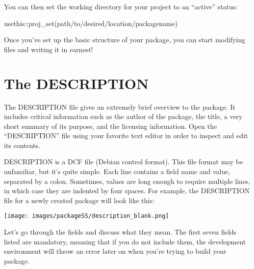\documentclass[
]{book}
\newenvironment{Shaded}{\begin{snugshade}}{\end{snugshade}}
\newcommand{\FunctionTok}[1]{\textcolor[rgb]{0.00,0.00,0.00}{#1}}
\newcommand{\NormalTok}[1]{#1}
\newcommand{\SpecialCharTok}[1]{\textcolor[rgb]{0.00,0.00,0.00}{#1}}
\newcommand{\StringTok}[1]{\textcolor[rgb]{0.31,0.60,0.02}{#1}}
\begin{document}
You can then set the working directory for your project to an ``active'' status:

\begin{Shaded}
\begin{Highlighting}[]
\NormalTok{usethis}\SpecialCharTok{::}\FunctionTok{proj\_set}\NormalTok{(}\StringTok{\textquotesingle{}path/to/desired/location/packagename\textquotesingle{}}\NormalTok{)}
\end{Highlighting}
\end{Shaded}

Once you've set up the basic structure of your package, you can start modifying files and writing it in earnest!

\hypertarget{the-description}{%
\section{The DESCRIPTION}\label{the-description}}

The DESCRIPTION file gives an extremely brief overview to the package. It includes critical information such as the author of the package, the title, a very short summary of its purpose, and the licensing information. Open the ``DESCRIPTION'' file using your favorite text editor in order to inspect and edit its contents.

DESCRIPTION is a DCF file (Debian control format). This file format may be unfamiliar, but it's quite simple. Each line contains a field name and value, separated by a colon. Sometimes, values are long enough to require multiple lines, in which case they are indented by four spaces. For example, the DESCRIPTION file for a newly created package will look like this:

\texttt{[image: images/packageSS/description\_blank.png]}

Let's go through the fields and discuss what they mean. The first seven fields listed are mandatory, meaning that if you do not include them, the development environment will throw an error later on when you're trying to build your package.
\end{document}
